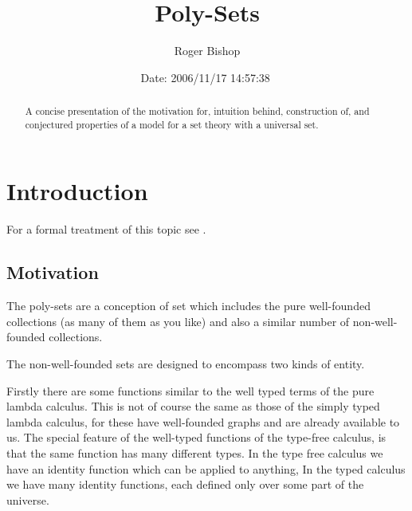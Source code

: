 \documentclass[numreferences]{rbjk}
\begin{document}
                                                                                   
\begin{article}
\begin{opening}  
\title{Poly-Sets}
\author{Roger Bishop }
\date{$ $Date: 2006/11/17 14:57:38 $ $}

\begin{abstract}
A concise presentation of the motivation for, intuition behind, construction of, and conjectured properties of a model for a set theory with a universal set.
\end{abstract}
\end{opening}

\setcounter{tocdepth}{4}
{\parskip-0pt\tableofcontents}

\section{Introduction}

For a formal treatment of this topic see \cite{rbjt020}.

\subsection{Motivation}

The poly-sets are a conception of set which includes the pure well-founded collections (as many of them as you like) and also a similar number of non-well-founded collections.

The non-well-founded sets are designed to encompass two kinds of entity.

Firstly there are some functions similar to the well typed terms of the pure lambda calculus.
This is not of course the same as those of the simply typed lambda calculus, for these have well-founded graphs and are already available to us.
The special feature of the well-typed functions of the type-free calculus, is that the same function has many different types.
In the type free calculus we have an identity function which can be applied to anything,
In the typed calculus we have many identity functions, each defined only over some part of the universe.


\end{article}
\end{document}
